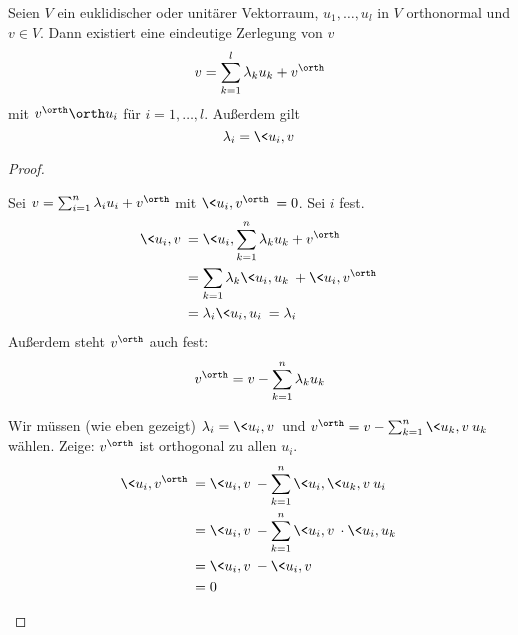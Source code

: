 \documentclass{mycourse}
\begin{document}
\begin{prop}
	\label{prop:13.9}
	Seien $V$ ein euklidischer oder unitärer Vektorraum, $u_1,\dotsc, u_l$ in $V$ orthonormal und $v\in V$.
	Dann existiert eine eindeutige Zerlegung von $v$
	\[
		v = \sum_{k=1}^l \lambda_ku_k + v^\orth
	\]
	mit $v^\orth \orth u_i$ für $i=1,\dotsc, l$.
	Außerdem gilt
	\[
		\lambda_i = \<u_i, v\>
	\]
	\begin{proof}
		\begin{seg}[Eindeutigkeit]
			Sei $v=\sum_{i=1}^n\lambda_iu_i + v^\orth$ mit $\<u_i,v^\orth\>=0$.
			Sei $i$ fest.
			\begin{align*}
				\<u_i,v\> &= \<u_i,\sum_{k=1}^n\lambda_k u_k + v^\orth\>\\
						  &=\sum_{k=1}\lambda_k\<u_i,u_k\> +\<u_i,v^\orth\>\\
						  &=\lambda_i\<u_i,u_i\> = \lambda_i
			\end{align*}
			Außerdem steht $v^\orth$ auch fest:
			\[
				v^\orth = v - \sum_{k=1}^n\lambda_ku_k
			\]
		\end{seg}
		\begin{seg}[Existenz]
			Wir müssen (wie eben gezeigt) $\lambda_i=\<u_i,v\>$ und $v^\orth = v-\sum_{k=1}^n\<u_k,v\>u_k$ wählen.
			Zeige: $v^\orth$ ist orthogonal zu allen $u_i$.
			\begin{align*}
				\<u_i,v^\orth\> &= \<u_i,v\> -\sum_{k=1}^n \<u_i,\<u_k,v\>u_i\>\\
								&=\<u_i,v\> -\sum_{k=1}^n \<u_i,v\>\cdot\<u_i,u_k\>\\
					&=\<u_i,v\> - \<u_i,v\>\\
				 &=0
			\end{align*}
		\end{seg}
	\end{proof}
\end{prop}
\end{document}
